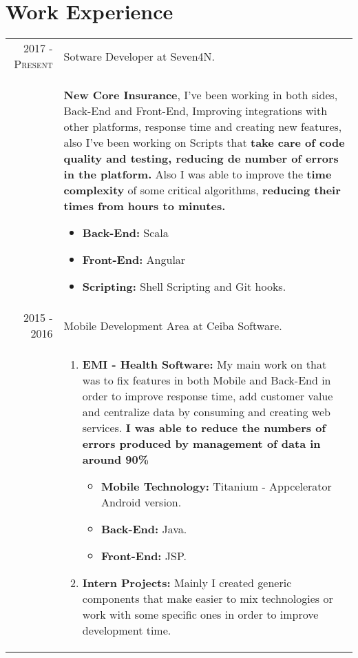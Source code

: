 \documentclass[a4paper,10pt]{article} %
\begin{document}

\section{Work Experience}

\begin{tabular}{r|p{11cm}}

\textsc{2017 - Present} & Sotware Developer at Seven4N.\\
& \footnotesize{
\textbf{New Core Insurance}, I've been working in both sides, Back-End and Front-End, Improving integrations with other platforms, response time and creating new features, also I've been working on Scripts that \textbf{take care of code quality and testing, reducing de number of errors in the platform.} Also I was able to improve the \textbf{time complexity} of some critical algorithms, \textbf{reducing their times from hours to minutes.}
\begin{itemize}
\item \textbf{Back-End:} Scala
\item \textbf{Front-End:} Angular
\item \textbf{Scripting:} Shell Scripting and Git hooks.
\end{itemize}}\\
\textsc{2015 - 2016} & Mobile Development Area at Ceiba Software.\\
& \footnotesize{
\begin{enumerate}
\item \textbf{EMI - Health Software:} My main work on that was to fix features in both Mobile and Back-End in order to improve response time, add customer value and centralize data by consuming and creating web services. \textbf{I was able to reduce the numbers of errors produced by management of data in around 90\%}
\begin{itemize}
\item \textbf{Mobile Technology:} Titanium - Appcelerator Android version.
\item \textbf{Back-End:} Java.
\item \textbf{Front-End:} JSP.
\end{itemize}
\item \textbf{Intern Projects:} Mainly I created generic components that make easier to mix technologies or work with some specific ones in order to improve development time.

\end{enumerate}}
\end{tabular}
\end{document}
